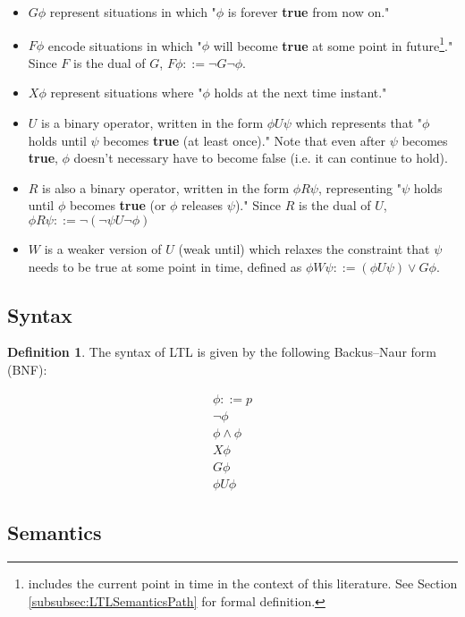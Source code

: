\documentclass{article}
\theoremstyle{plain}
\theoremstyle{definition}
\newtheorem{defn}[thm]{Definition} %
\begin{document}
\begin{multicols}{2}
\begin{itemize}
\item $G\phi$ represent situations in which "$\phi$ is forever \textbf{true} from now on."
\item $F\phi$ encode situations in which "$\phi$ will become \textbf{true} at some point in future\footnote{includes the current point in time in the context of this literature. See Section \ref{subsubsec:LTLSemanticsPath} for formal definition.}." Since $F$ is the dual of $G$, $F\phi ::= \lnot G\lnot\phi$.
\item $X\phi$ represent situations where "$\phi$ holds at the next time instant."
\item $U$ is a binary operator, written in the form $\phi U \psi$ which represents that "$\phi$ holds until $\psi$ becomes \textbf{true} (at least once)." Note that even after $\psi$ becomes \textbf{true}, $\phi$ doesn't necessary have to become false (i.e. it can continue to hold).
\item $R$ is also a binary operator, written in the form $\phi R \psi$, representing "$\psi$ holds until $\phi$ becomes \textbf{true} (or $\phi$ releases $\psi$)." Since $R$ is the dual of $U$, $\phi R \psi ::= \lnot(\lnot\psi U\lnot\phi)$
\item $W$ is a weaker version of $U$ (weak until) which relaxes the constraint that $\psi$ needs to be true at some point in time, defined as $\phi W\psi ::= (\phi U \psi)\lor G\phi$.
\end{itemize}

\subsection{Syntax}

\begin{defn}The syntax of LTL is given by the following Backus–Naur form (BNF):\end{defn}

\begin{align*}
\phi ::= p \\
\lnot\phi \\
\phi \land \phi  \\
X\phi \\
G\phi \\
\phi U \phi
\end{align*}


\subsection{Semantics}


\end{multicols}
\end{document}
